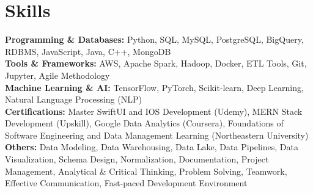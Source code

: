 \documentclass[a4paper,10pt]{article}
\begin{document}
\section*{Skills}
\textbf{Programming \& Databases: } Python, SQL, MySQL, PostgreSQL, BigQuery, RDBMS, JavaScript, Java, C++, MongoDB \\
\textbf{Tools \& Frameworks:}   AWS, Apache Spark, Hadoop, Docker, ETL Tools, Git, Jupyter, Agile Methodology \\
\textbf{Machine Learning \& AI: } TensorFlow, PyTorch, Scikit-learn, Deep Learning, Natural Language Processing (NLP) \\
\textbf{Certifications:} Master SwiftUI and IOS Development (Udemy), MERN Stack Development (Upskill), Google Data Analytics (Coursera), Foundations of Software Engineering and Data Management Learning (Northeastern University) \\
\textbf{Others: } Data Modeling, Data Warehousing, Data Lake, Data Pipelines, Data Visualization, Schema Design, Normalization, Documentation, Project Management, Analytical \& Critical Thinking, Problem Solving, Teamwork, Effective Communication, Fast-paced Development Environment \\

\vspace{-4mm}
\end{document}
